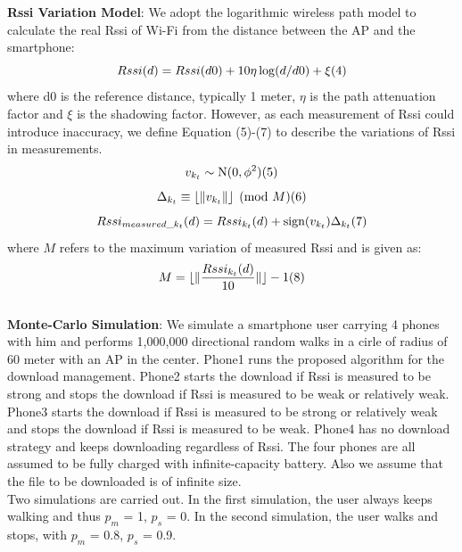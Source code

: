\documentclass[journal]{IEEEtran}
\begin{document}
{\bf Rssi Variation Model}:
We adopt the logarithmic wireless path model \cite{biblio9} to calculate the real Rssi of Wi-Fi from the distance between the AP and the smartphone:
$$ Rssi(d) = Rssi(d0) + 10\eta\log(d/d0) + \xi \relax(4)$$
where d0 is the reference distance, typically 1 meter, $\eta$ is the path attenuation factor and $\xi$ is the shadowing factor.
However, as each measurement of Rssi could introduce inaccuracy, we define Equation (5)-(7) to describe the variations of Rssi in measurements.
$$ v_{k_{t}} \sim \textrm{N}(0, \phi^2) \relax(5) $$
$$ \Delta_{k_{t}} \equiv \lfloor\|v_{k_{t}}\|\rfloor \pmod{M}  \relax(6) $$
$$ Rssi_{measured\_k_{t}}(d) = Rssi_{k_{t}}(d) + \textrm{sign}(v_{k_{t}})\Delta_{k_{t}} \relax(7)$$
where $M$ refers to the maximum variation of measured Rssi
and is given as:
$$M=\lfloor\|\frac{Rssi_{k_{t}}(d)}{10}\|\rfloor-1 \relax(8)$$
\\
\indent
{\bf Monte-Carlo Simulation}: We simulate a smartphone user
carrying 4 phones with him and performs 1,000,000 directional random walks in a cirle of radius of 60 meter with an AP in the center. 
Phone1 runs the proposed algorithm for the download management.  
Phone2 starts the download if Rssi is measured to be strong and stops the download if Rssi is measured to be weak or relatively weak. 
Phone3 starts the download if Rssi is measured to be strong or relatively weak and stops the download if Rssi is measured to be weak.
Phone4 has no download strategy and keeps downloading regardless of Rssi. 
The four phones are all assumed to be fully charged with 
infinite-capacity battery. 
Also we assume that the file to be downloaded is of infinite size.
\\
\indent
Two simulations are carried out. In the first simulation, 
the user always keeps walking and thus $p_{m}$ = 1, $p_{s}$ = 0. 
In the second simulation, the user walks and stops, with $p_{m}$ = 0.8, $p_{s}$ = 0.9. 
\end{document}
